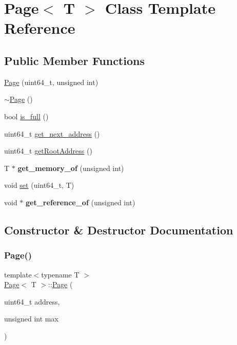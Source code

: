 \hypertarget{class_page}{}\section{Page$<$ T $>$ Class Template Reference}
\label{class_page}
\subsection*{Public Member Functions}
\begin{DoxyCompactItemize}
\item 
\hyperlink{class_page_ac9e22e2694dfa6a7dc4f80166c0217c5}{Page} (uint64\+\_\+t, unsigned int)
\item 
\hyperlink{class_page_a7312a131c7f52718cf4f2b6f487d31bf}{$\sim$\+Page} ()
\item 
bool \hyperlink{class_page_a8c27abd6fb2ce55c05b065584b4bcc75}{is\+\_\+full} ()
\item 
uint64\+\_\+t \hyperlink{class_page_ae6ac153d53ddb0493a4fff270dfa42cb}{get\+\_\+next\+\_\+address} ()
\item 
uint64\+\_\+t \hyperlink{class_page_a438a928e0ce67dc404f183678eb533ec}{get\+Root\+Address} ()
\item 
\mbox{\label{class_page_a2695af38818eda73c4e8b5e00d04fa55}} 
T $\ast$ {\bfseries get\+\_\+memory\+\_\+of} (unsigned int)
\item 
void \hyperlink{class_page_a4de67b2afdfe14758388f745a8a99d56}{set} (uint64\+\_\+t, T)
\item 
\mbox{\label{class_page_aefe72b00d99730ca199f7d42c1b7d95f}} 
void $\ast$ {\bfseries get\+\_\+reference\+\_\+of} (unsigned int)
\end{DoxyCompactItemize}


\subsection{Constructor \& Destructor Documentation}
\mbox{\label{class_page_ac9e22e2694dfa6a7dc4f80166c0217c5}} 
\subsubsection{\texorpdfstring{Page()}{Page()}}
{\footnotesize\ttfamily template$<$typename T $>$ \\
\hyperlink{class_page}{Page}$<$ T $>$\+::\hyperlink{class_page}{Page} (\begin{DoxyParamCaption}\item[{uint64\+\_\+t}]{address,  }\item[{unsigned int}]{max }\end{DoxyParamCaption})}


